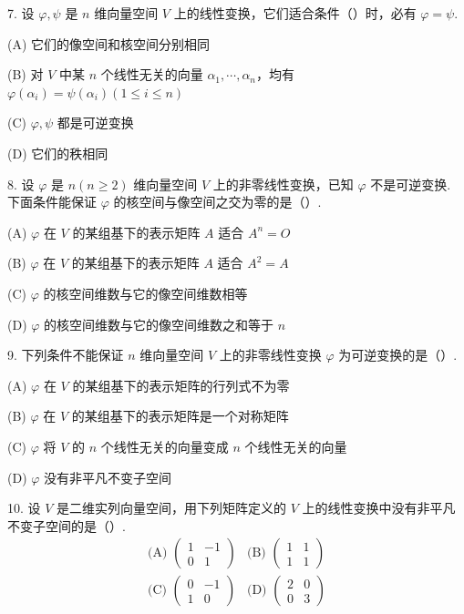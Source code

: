 \documentclass[UTF8,12pt,a4paper,fontset=fandol]{ctexart}
\begin{document}
7. 设 $\varphi,\psi$ 是 $n$ 维向量空间 $V$ 上的线性变换，它们适合条件（\quad）时，必有 $\varphi=\psi$.

(A) 它们的像空间和核空间分别相同

(B) 对 $V$ 中某 $n$ 个线性无关的向量 $\alpha_1,\cdots,\alpha_n$，均有 $\varphi(\alpha_i)=\psi(\alpha_i)(1\le i\le n)$

(C) $\varphi,\psi$ 都是可逆变换

(D) 它们的秩相同

8. 设 $\varphi$ 是 $n(n\ge2)$ 维向量空间 $V$ 上的非零线性变换，已知 $\varphi$ 不是可逆变换. 下面条件能保证 $\varphi$ 的核空间与像空间之交为零的是（\quad）.

(A) $\varphi$ 在 $V$ 的某组基下的表示矩阵 $A$ 适合 $A^n=O$

(B) $\varphi$ 在 $V$ 的某组基下的表示矩阵 $A$ 适合 $A^2=A$

(C) $\varphi$ 的核空间维数与它的像空间维数相等

(D) $\varphi$ 的核空间维数与它的像空间维数之和等于 $n$

9. 下列条件不能保证 $n$ 维向量空间 $V$ 上的非零线性变换 $\varphi$ 为可逆变换的是（\quad）.

(A) $\varphi$ 在 $V$ 的某组基下的表示矩阵的行列式不为零

(B) $\varphi$ 在 $V$ 的某组基下的表示矩阵是一个对称矩阵

(C) $\varphi$ 将 $V$ 的 $n$ 个线性无关的向量变成 $n$ 个线性无关的向量

(D) $\varphi$ 没有非平凡不变子空间

10. 设 $V$ 是二维实列向量空间，用下列矩阵定义的 $V$ 上的线性变换中没有非平凡不变子空间的是（\quad）.
\[
\begin{array}{ll}
\text{(A) }\left(\begin{array}{rr}1&-1\\0&1\end{array}\right)
&
\text{(B) }\left(\begin{array}{rr}1&1\\1&1\end{array}\right)
\\[1.2em]
\text{(C) }\left(\begin{array}{rr}0&-1\\1&0\end{array}\right)
&
\text{(D) }\left(\begin{array}{rr}2&0\\0&3\end{array}\right)
\end{array}
\]
\end{document}
